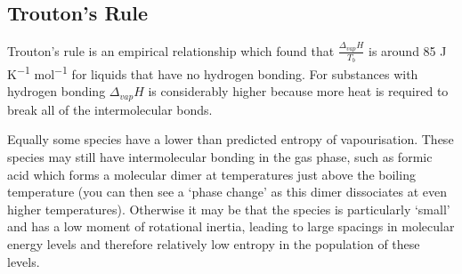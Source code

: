 \documentclass[
]{book}
\begin{document}
\hypertarget{troutons-rule}{%
\subsection{Trouton's Rule}\label{troutons-rule}}

Trouton's rule is an empirical relationship which found that \(\frac{\Delta_{vap} H }{T_b}\) is around 85 J K\textsuperscript{−1} mol\textsuperscript{−1} for liquids that have no hydrogen bonding. For substances with hydrogen bonding \(\Delta_{vap} H\) is considerably higher because more heat is required to break all of the intermolecular bonds.

Equally some species have a lower than predicted entropy of vapourisation. These species may still have intermolecular bonding in the gas phase, such as formic acid which forms a molecular dimer at temperatures just above the boiling temperature (you can then see a `phase change' as this dimer dissociates at even higher temperatures). Otherwise it may be that the species is particularly `small' and has a low moment of rotational inertia, leading to large spacings in molecular energy levels and therefore relatively low entropy in the population of these levels.
\end{document}
